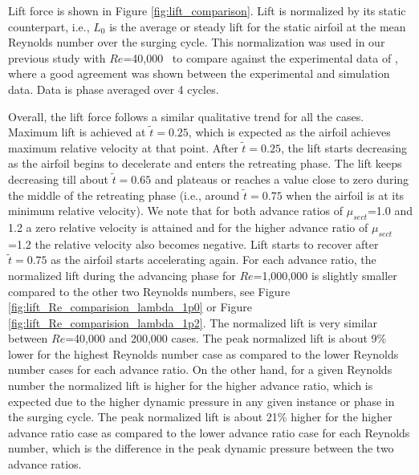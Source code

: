 Lift force is shown in Figure \ref{fig:lift_comparison}.
Lift is normalized by its static counterpart, i.e., $L_0$ is the average or steady lift for the static airfoil at the mean Reynolds number over the surging cycle.
This normalization was used in our previous study with $Re$=40,000~\cite{bib:kocher_scitech2017} to compare against the experimental data of \cite{bib:granlund2016}, where a good agreement was shown between the experimental and simulation data.
Data is phase averaged over 4 cycles.

Overall, the lift force follows a similar qualitative trend for all the cases.
Maximum lift is achieved at $\tilde{t}=0.25$, which is expected as the airfoil achieves maximum relative velocity at that point.
After $\tilde{t}=0.25$, the lift starts decreasing as the airfoil begins to decelerate and enters the retreating phase. 
The lift keeps decreasing till about $\tilde{t}=0.65$ and plateaus or reaches a value close to zero during the middle of the retreating phase (i.e., around $\tilde{t}=0.75$ when the airfoil is at its minimum relative velocity).
We note that for both advance ratios of $\mu_{sect}$=1.0 and 1.2 a zero relative velocity is attained and for the higher advance ratio of $\mu_{sect}$=1.2 the relative velocity also becomes negative.
Lift starts to recover after $\tilde{t}=0.75$ as the airfoil starts accelerating again.
For each advance ratio, the normalized lift during the advancing phase for $Re$=1,000,000 is slightly smaller compared to the other two Reynolds numbers, see Figure \ref{fig:lift_Re_comparision_lambda_1p0} or Figure \ref{fig:lift_Re_comparision_lambda_1p2}.
The normalized lift is very similar between $Re$=40,000 and 200,000 cases.
The peak normalized lift is about 9\% lower for the highest Reynolds number case as compared to the lower Reynolds number cases for each advance ratio.
On the other hand, for a given Reynolds number the normalized lift is higher for the higher advance ratio, which is expected due to the higher dynamic pressure in any given instance or phase in the surging cycle.
The peak normalized lift is about 21\% higher for the higher advance ratio case as compared to the lower advance ratio case for each Reynolds number, which is the difference in the peak dynamic pressure between the two advance ratios.

